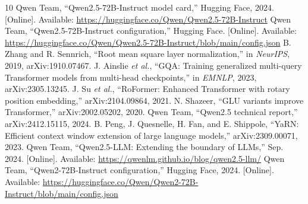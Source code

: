 \documentclass[conference]{IEEEtran}
\begin{document}
\begin{thebibliography}{10}
 Qwen Team, ``Qwen2.5-72B-Instruct model card,'' Hugging Face, 2024. [Online]. Available: \url{https://huggingface.co/Qwen/Qwen2.5-72B-Instruct}
 Qwen Team, ``Qwen2.5-72B-Instruct configuration,'' Hugging Face. [Online]. Available: \url{https://huggingface.co/Qwen/Qwen2.5-72B-Instruct/blob/main/config.json}
 B. Zhang and R. Sennrich, ``Root mean square layer normalization,'' in \emph{NeurIPS}, 2019, arXiv:1910.07467.
 J. Ainslie \emph{et al.}, ``GQA: Training generalized multi-query Transformer models from multi-head checkpoints,'' in \emph{EMNLP}, 2023, arXiv:2305.13245.
 J. Su \emph{et al.}, ``RoFormer: Enhanced Transformer with rotary position embedding,'' arXiv:2104.09864, 2021.
 N. Shazeer, ``GLU variants improve Transformer,'' arXiv:2002.05202, 2020.
 Qwen Team, ``Qwen2.5 technical report,'' arXiv:2412.15115, 2024.
 B. Peng, J. Quesnelle, H. Fan, and E. Shippole, ``YaRN: Efficient context window extension of large language models,'' arXiv:2309.00071, 2023.
 Qwen Team, ``Qwen2.5-LLM: Extending the boundary of LLMs,'' Sep. 2024. [Online]. Available: \url{https://qwenlm.github.io/blog/qwen2.5-llm/}
 Qwen Team, ``Qwen2-72B-Instruct configuration,'' Hugging Face, 2024. [Online]. Available: \url{https://huggingface.co/Qwen/Qwen2-72B-Instruct/blob/main/config.json}
\end{thebibliography}
\end{document}
